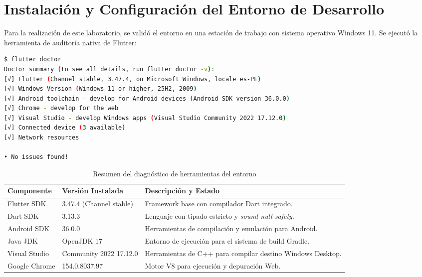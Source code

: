 \documentclass[12pt,a4paper]{article}
\begin{document}
\section{Instalación y Configuración del Entorno de Desarrollo}

Para la realización de este laboratorio, se validó el entorno en una estación de trabajo con sistema operativo Windows 11. Se ejecutó la herramienta de auditoría nativa de Flutter:

\begin{lstlisting}[language=bash,caption={Ejecución y resultado de auditoría con flutter doctor}]
$ flutter doctor
Doctor summary (to see all details, run flutter doctor -v):
[√] Flutter (Channel stable, 3.47.4, on Microsoft Windows, locale es-PE)
[√] Windows Version (Windows 11 or higher, 25H2, 2009)
[√] Android toolchain - develop for Android devices (Android SDK version 36.0.0)
[√] Chrome - develop for the web
[√] Visual Studio - develop Windows apps (Visual Studio Community 2022 17.12.0)
[√] Connected device (3 available)
[√] Network resources

• No issues found!
\end{lstlisting}

\begin{table}[h!]
\small
\noindent
\begin{tabularx}{\textwidth}{@{}llX@{}}
\toprule
\textbf{Componente} & \textbf{Versión Instalada} & \textbf{Descripción y Estado} \\ \midrule
Flutter SDK & 3.47.4 (Channel stable) & Framework base con compilador Dart integrado. \\
Dart SDK & 3.13.3 & Lenguaje con tipado estricto y \textit{sound null-safety}. \\
Android SDK & 36.0.0 & Herramientas de compilación y emulación para Android. \\
Java JDK & OpenJDK 17 & Entorno de ejecución para el sistema de build Gradle. \\
Visual Studio & Community 2022 17.12.0 & Herramientas de C++ para compilar destino Windows Desktop. \\
Google Chrome & 154.0.8037.97 & Motor V8 para ejecución y depuración Web. \\ \bottomrule
\end{tabularx}
\caption{Resumen del diagnóstico de herramientas del entorno}
\end{table}
\end{document}

